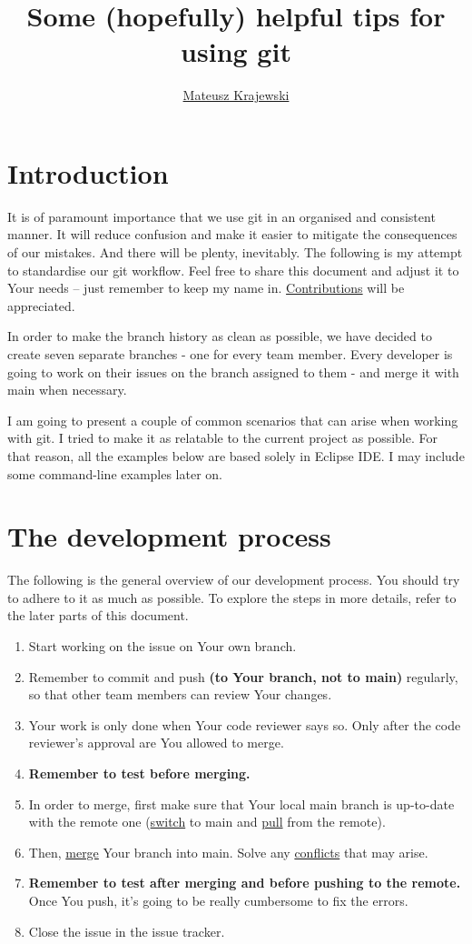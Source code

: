 \documentclass{article}
\title{Some (hopefully) helpful tips for using git}
\author{\href{https://www.linkedin.com/in/mkrajewski14/}{Mateusz Krajewski}}
\begin{document}
\maketitle
\tableofcontents
\newpage

\section{Introduction} 
It is of paramount importance that we use git in an organised and consistent manner. It will reduce confusion and make it easier to mitigate the consequences of our mistakes. And there will be plenty, inevitably. The following is my attempt to standardise our git workflow. Feel free to share this document and adjust it to Your needs -- just remember to keep my name in. \hyperref[sec:contributing]{Contributions} will be appreciated.

In order to make the branch history as clean as possible, we have decided to create seven separate branches - one for every team member. Every developer is going to work on their issues on the branch assigned to them - and merge it with main when necessary.

I am going to present a couple of common scenarios that can arise when working with git. I tried to make it as relatable to the current project as possible. For that reason, all the examples below are based solely in Eclipse IDE. I may include some command-line examples later on.

\section{The development process}

The following is the general overview of our development process. You should try to adhere to it as much as possible. To explore the steps in more details, refer to the later parts of this document.

\begin{enumerate}
	\item Start working on the issue on Your own branch.
	\item Remember to commit and push \textbf{(to Your branch, not to main)} regularly, so that other team members can review Your changes.
	\item Your work is only done when Your code reviewer says so. Only after the code reviewer's approval are You allowed to merge.
	\item \textbf{Remember to test before merging.}
	\item In order to merge, first make sure that Your local main branch is up-to-date with the remote one (\hyperref[sec:switching]{switch} to main and \hyperref[sec:pulling]{pull} from the remote).
	\item Then, \hyperref[sec:merging]{merge} Your branch into main. Solve any \hyperref[sec:conflicts]{conflicts} that may arise.
	\item \textbf{Remember to test after merging and before pushing to the remote.} Once You push, it's going to be really cumbersome to fix the errors.
	\item Close the issue in the issue tracker.
\end{enumerate}
\end{document}
